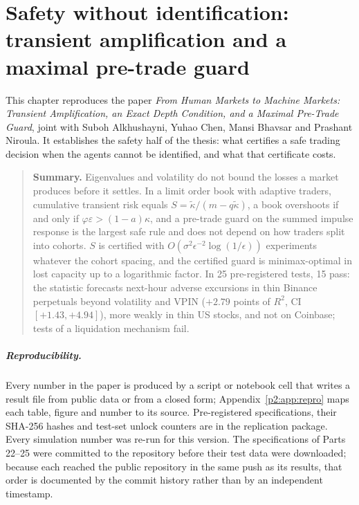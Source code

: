 \chapter{Safety without identification: transient amplification and a maximal pre-trade guard}\label{ch:p2}

This chapter reproduces the paper \emph{From Human Markets to Machine Markets: Transient Amplification, an Exact Depth Condition, and a Maximal Pre-Trade Guard}, joint with Suboh Alkhushayni, Yuhao Chen, Mansi Bhavsar and Prashant Niroula. It establishes the safety half of the thesis: what certifies a safe trading decision when the agents cannot be identified, and what that certificate costs.

\begin{quote}\small\textbf{Summary.} Eigenvalues and volatility do not bound the losses a market produces before it settles. In a limit order book with adaptive traders, cumulative transient risk equals $S=\tilde\kappa/(m-q\tilde\kappa)$, a book overshoots if and only if $\varphi\varepsilon>(1-a)\kappa$, and a pre-trade guard on the summed impulse response is the largest safe rule and does not depend on how traders split into cohorts. $S$ is certified with $O(\sigma^2\epsilon^{-2}\log(1/\epsilon))$ experiments whatever the cohort spacing, and the certified guard is minimax-optimal in lost capacity up to a logarithmic factor. In 25 pre-registered tests, 15 pass: the statistic forecasts next-hour adverse excursions in thin Binance perpetuals beyond volatility and VPIN ($+2.79$ points of $R^2$, CI $[+1.43,+4.94]$), more weakly in thin US stocks, and not on Coinbase; tests of a liquidation mechanism fail.\end{quote}

\paragraph{Reproducibility.}Every number in the paper is produced by a script or notebook cell that writes a result file from public data or from a closed form; Appendix~\ref{p2:app:repro} maps each table, figure and number to its source. Pre-registered specifications, their SHA-256 hashes and test-set unlock counters are in the replication package. Every simulation number was re-run for this version. The specifications of Parts 22--25 were committed to the repository before their test data were downloaded; because each reached the public repository in the same push as its results, that order is documented by the commit history rather than by an independent timestamp.

